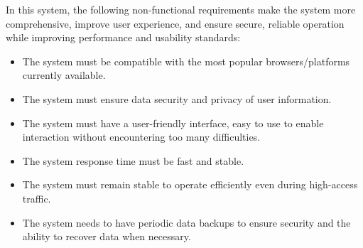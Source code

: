 \indent

  In this system, the following non-functional requirements make the system more comprehensive, improve user experience, and ensure secure, reliable operation while improving performance and usability standards: 
\begin{itemize}[itemsep=-0.1cm, topsep=0.1cm]
    \item The system must be compatible with the most popular browsers/platforms currently available.
    \item The system must ensure data security and privacy of user information.
    \item The system must have a user-friendly interface, easy to use to enable interaction without encountering too many difficulties.
    \item The system response time must be fast and stable.
    \item The system must remain stable to operate efficiently even during high-access traffic.
    \item The system needs to have periodic data backups to ensure security and the ability to recover data when necessary.
\end{itemize}
